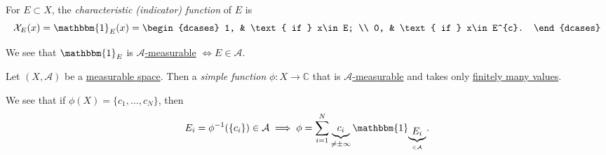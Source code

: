 \begin{definition}\label{def:characteristic-function}
	For \(E\subset X\), the \emph{characteristic (indicator) function} of \(E\) is
	\[
		\mathcal{X} _E (x)= \mathbbm{1}_{E}(x) = \begin{dcases}
			1, & \text{ if }  x\in E;     \\
			0, & \text{ if }  x\in E^{c}.
		\end{dcases}
	\]
\end{definition}
\begin{remark}
	We see that \(\mathbbm{1}_{ E}\) is \hyperref[def:A-measurable-function]{\(\mathcal{A}\)-measurable} \(\iff E\in\mathcal{A}\).
\end{remark}

\begin{definition}\label{def:simple-function}
	Let \((X, \mathcal{A} )\) be a \hyperref[def:measurable-space]{measurable space}. Then a \emph{simple function} \(\phi \colon X\to \mathbb{C} \) that
	is \hyperref[def:A-measurable-function]{\(\mathcal{A} \)-measurable} and takes only \underline{finitely many values}.
\end{definition}
\begin{remark}
	We see that if \(\phi (X) = \{c_1, \dots , c_N \}\), then
	\[
		E_{i}= \phi ^{-1} (\{c_{i}\})\in \mathcal{A} \implies \phi = \sum\limits_{i=1}^{N} \underbrace{c_{i}}_{\neq \pm \infty }\mathbbm{1}_{\underbrace{E_{i}}_{\in \mathcal{A}}}.
	\]
\end{remark}